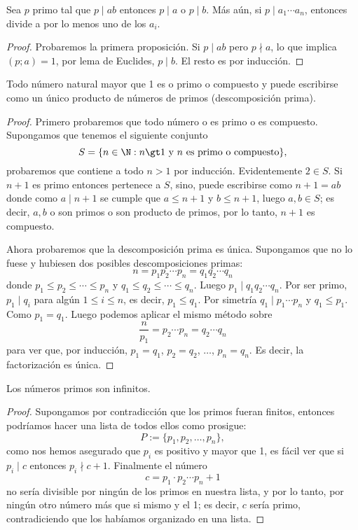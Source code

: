 \documentclass[11pt,oneside]{book}
\begin{document}
\begin{thm}
Sea $p$ primo tal que $p\mid ab$ entonces $p\mid a$ o $p\mid b$. Más aún, si $p\mid a_1\cdots a_n$, entonces divide a por lo menos uno de los $a_i$.
\end{thm}
\begin{proof}
Probaremos la primera proposición. Si $p\mid ab$ pero $p\nmid a$, lo que implica $(p;a)=1$, por lema de Euclides, $p\mid b$. El resto es por inducción.
\end{proof}
\begin{thm}
Todo número natural mayor que 1 es o primo o compuesto y puede escribirse como un único producto de números de primos (descomposición prima).
\end{thm}
\begin{proof}
Primero probaremos que todo número o es primo o es compuesto. Supongamos que tenemos el siguiente conjunto
$$S=\{n\in\N:n\gt1\text{ y $n$ es primo o compuesto}\},$$
probaremos que contiene a todo $n\gt 1$ por inducción. Evidentemente $2\in S$. Si $n+1$ es primo entonces pertenece a $S$, sino, puede escribirse como $n+1=ab$ donde como $a\mid n+1$ se cumple que $a\leq n+1$ y $b\leq n+1$, luego $a,b\in S$; es decir, $a,b$ o son primos o son producto de primos, por lo tanto, $n+1$ es compuesto.

Ahora probaremos que la descomposición prima es única. Supongamos que no lo fuese y hubiesen dos posibles descomposiciones primas:
$$n=p_1p_2\cdots p_n=q_1q_2\cdots q_n$$
donde $p_1\leq p_2\leq\cdots\leq p_n$ y $q_1\leq q_2\leq\cdots\leq q_n$. Luego $p_1\mid q_1q_2\cdots q_n$. Por ser primo, $p_1\mid q_i$ para algún $1\leq i\leq n$, es decir, $p_1\leq q_1$. Por simetría $q_1\mid p_1\cdots p_n$ y $q_1\leq p_1$. Como $p_1=q_1$. Luego podemos aplicar el mismo método sobre
$$\frac{n}{p_1}=p_2\cdots p_n=q_2\cdots q_n$$
para ver que, por inducción, $p_1=q_1$, $p_2=q_2$, $\dots$, $p_n=q_n$. Es decir, la factorización es única.
\end{proof}
\begin{thm}
Los números primos son infinitos.
\end{thm}
\begin{proof}
Supongamos por contradicción que los primos fueran finitos, entonces podríamos hacer una lista de todos ellos como prosigue:
$$P:=\{p_1,p_2,\dots,p_n\},$$
como nos hemos asegurado que $p_i$ es positivo y mayor que 1, es fácil ver que si $p_i\mid c$ entonces $p_i\nmid c+1$. Finalmente el número
$$c=p_1\cdot p_2\cdots p_n+1$$
no sería divisible por ningún de los primos en nuestra lista, y por lo tanto, por ningún otro número más que si mismo y el 1; es decir, $c$ sería primo, contradiciendo que los habíamos organizado en una lista.
\end{proof}
\end{document}
